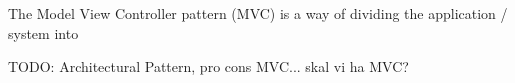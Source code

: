The Model View Controller pattern (MVC) is a way of dividing the application / system into 

TODO: Architectural Pattern, pro cons MVC... skal vi ha MVC? 

